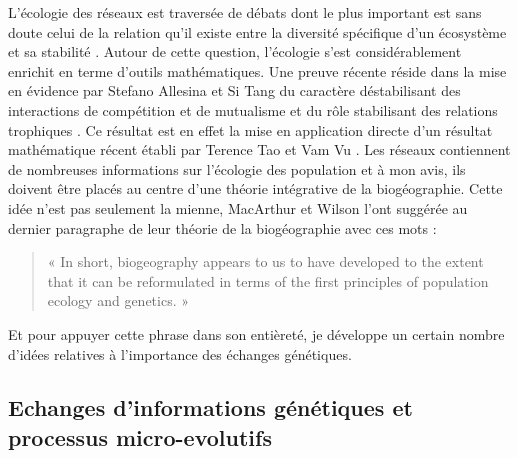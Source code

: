 L'écologie des réseaux est traversée de débats dont le plus important
est sans doute celui de la relation qu'il existe entre la diversité
spécifique d'un écosystème et sa stabilité
\citep[\citet{McCann2000}]{May1973}. Autour de cette question,
l'écologie s'est considérablement enrichit en terme d'outils
mathématiques. Une preuve récente réside dans la mise en évidence par
Stefano Allesina et Si Tang du caractère déstabilisant des interactions
de compétition et de mutualisme et du rôle stabilisant des relations
trophiques \citep{Allesina2012a}. Ce résultat est en effet la mise en
application directe d'un résultat mathématique récent établi par Terence
Tao et Vam Vu \citep{Tao2010}. Les réseaux contiennent de nombreuses
informations sur l'écologie des population et à mon avis, ils doivent
être placés au centre d'une théorie intégrative de la biogéographie.
Cette idée n'est pas seulement la mienne, MacArthur et Wilson l'ont
suggérée au dernier paragraphe de leur théorie de la biogéographie avec
ces mots \citep{MacArthur1967} :

\begin{quote}
« In short, biogeography appears to us to have developed to the extent
that it can be reformulated in terms of the first principles of
population ecology and genetics. »
\end{quote}

Et pour appuyer cette phrase dans son entièreté, je développe un certain
nombre d'idées relatives à l'importance des échanges génétiques.

\subsection*{Echanges d'informations génétiques et processus
micro-evolutifs}\label{echanges-dinformations-guxe9nuxe9tiques-et-processus-micro-evolutifs}

